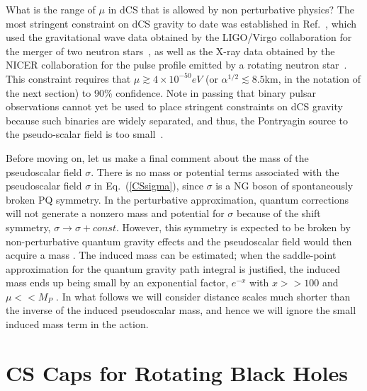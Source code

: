 \documentclass[prd,twocolumn,showpacs,superscriptaddress,nofootinbib]{revtex4-2}
\begin{document}
 What is the range of $\mu$ in dCS that is allowed by non perturbative physics? The most stringent constraint on dCS gravity to date was established in Ref.~\cite{Silva:2020acr}, which used the gravitational wave data obtained by the LIGO/Virgo collaboration for the merger of two neutron stars~\cite{TheLIGOScientific:2017qsa}, as well as the X-ray data obtained by the NICER collaboration for the pulse profile emitted by a rotating neutron star~\cite{Riley:2019yda,Miller:2019cac}. This constraint requires that $\mu \gtrsim 4 \times 10^{-50} eV$ (or $\alpha^{1/2} \lesssim 8.5$km, in the notation of the next section) to 90\% confidence. Note in passing that binary pulsar observations cannot yet be used to place stringent constraints on dCS gravity because such binaries are widely separated, and thus, the Pontryagin source to the pseudo-scalar field is too small~\cite{Yagi:2013mbt}.

 
Before moving on, let us make a final comment about the mass of the pseudoscalar field $\sigma$.  There is no mass or potential terms associated with the pseudoscalar  field $\sigma$ 
 in Eq.~(\ref {CSsigma}), since   $\sigma$ is a NG boson of spontaneously broken PQ symmetry. 
 In the perturbative approximation, quantum corrections will not generate a nonzero mass and potential for $\sigma$ 
because of the shift symmetry, $\sigma\to\sigma +const$. However,  this symmetry is expected to be 
broken  by non-perturbative  quantum gravity effects and the pseudoscalar field would then 
acquire a mass \cite{Kallosh:1995hi}. The induced mass can be estimated; when the saddle-point  
approximation for the quantum gravity path integral is justified, the induced mass  ends up being 
small by an exponential factor, $e^{- x}$ with $x >> 100$ and $\mu<<M_P$ \cite{Kallosh:1995hi}. 
In what follows we will  consider distance  scales much shorter than the inverse of the induced 
pseudoscalar mass, and hence we will  ignore the small induced mass term in the action.







 


\section{CS Caps for Rotating Black Holes}
\label{ABC}
 
\end{document}
